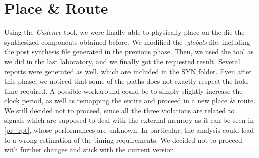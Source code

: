 \section{Place \& Route}

Using the \textit{Cadence} tool, we were finally able to physically place on the die the synthesized components obtained before. We modified the \textit{.globals} file, including the post synthesis file generated in the previous phase. Then, we used the tool as we did in the last laboratory, and we finally got the requested result. Several reports were generated as well, which are included in the \textsc{SYN} folder. Even after this phase, we noticed that some of the paths does not exactly respect the hold time required. A possible workaround could be to simply slightly increase the clock period, as well as remapping the entire \dlx and proceed in a new place \& route. We still decided not to proceed, since all the three violations are related to signals which are supposed to deal with the external memory as it can be seen in \ref{pr_rpt}, whose performances are unknown. In particular, the analysis could lead to a wrong estimation of the timing requirements. We decided not to proceed with further changes and stick with the current version.